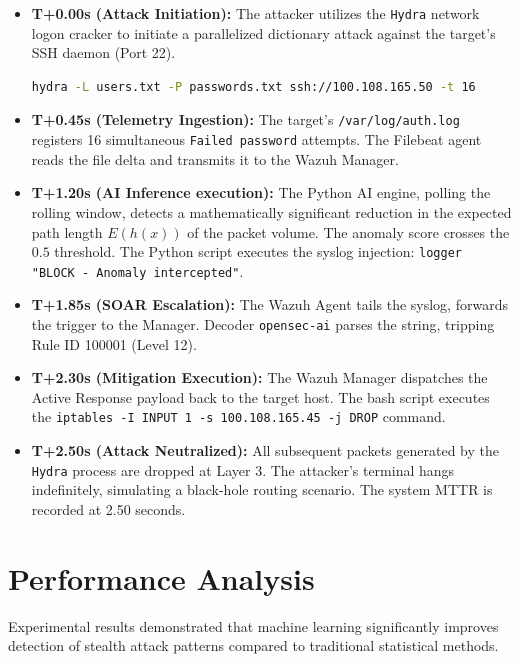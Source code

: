 \documentclass[12pt, a4paper]{report}
\begin{document}
	\begin{itemize}
		\item \textbf{T+0.00s (Attack Initiation):} The attacker utilizes the \texttt{Hydra} network logon cracker to initiate a parallelized dictionary attack against the target's SSH daemon (Port 22).
		\begin{lstlisting}[language=bash]
			hydra -L users.txt -P passwords.txt ssh://100.108.165.50 -t 16
		\end{lstlisting}
		
		\item \textbf{T+0.45s (Telemetry Ingestion):} The target's \texttt{/var/log/auth.log} registers 16 simultaneous \texttt{Failed password} attempts. The Filebeat agent reads the file delta and transmits it to the Wazuh Manager.
		
		\item \textbf{T+1.20s (AI Inference execution):} The Python AI engine, polling the rolling window, detects a mathematically significant reduction in the expected path length $E(h(x))$ of the packet volume. The anomaly score crosses the $0.5$ threshold. The Python script executes the syslog injection: \texttt{logger "BLOCK - Anomaly intercepted"}.
		
		\item \textbf{T+1.85s (SOAR Escalation):} The Wazuh Agent tails the syslog, forwards the trigger to the Manager. Decoder \texttt{opensec-ai} parses the string, tripping Rule ID 100001 (Level 12).
		
		\item \textbf{T+2.30s (Mitigation Execution):} The Wazuh Manager dispatches the Active Response payload back to the target host. The bash script executes the \texttt{iptables -I INPUT 1 -s 100.108.165.45 -j DROP} command.
		
		\item \textbf{T+2.50s (Attack Neutralized):} All subsequent packets generated by the \texttt{Hydra} process are dropped at Layer 3. The attacker's terminal hangs indefinitely, simulating a black-hole routing scenario. The system MTTR is recorded at 2.50 seconds.
	\end{itemize}
	
	\section{Performance Analysis}
	
	Experimental results demonstrated that machine learning significantly
	improves detection of stealth attack patterns compared to traditional
	statistical methods.
	
\end{document}
